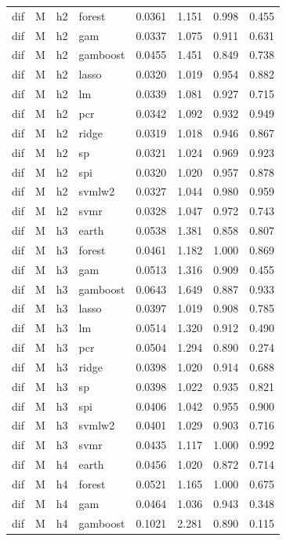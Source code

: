 \begin{ThreePartTable}
\begin{longtable}[t]{llclcccc}
dif & M & h2 & forest & 0.0361 & 1.151 & 0.998 & 0.455\\
dif & M & h2 & gam & 0.0337 & 1.075 & 0.911 & 0.631\\
dif & M & h2 & gamboost & 0.0455 & 1.451 & 0.849 & 0.738\\
dif & M & h2 & lasso & 0.0320 & 1.019 & 0.954 & 0.882\\
dif & M & h2 & lm & 0.0339 & 1.081 & 0.927 & 0.715\\
dif & M & h2 & pcr & 0.0342 & 1.092 & 0.932 & 0.949\\
dif & M & h2 & ridge & 0.0319 & 1.018 & 0.946 & 0.867\\
dif & M & h2 & sp & 0.0321 & 1.024 & 0.969 & 0.923\\
dif & M & h2 & spi & 0.0320 & 1.020 & 0.957 & 0.878\\
dif & M & h2 & svmlw2 & 0.0327 & 1.044 & 0.980 & 0.959\\
dif & M & h2 & svmr & 0.0328 & 1.047 & 0.972 & 0.743\\
\addlinespace
dif & M & h3 & earth & 0.0538 & 1.381 & 0.858 & 0.807\\
dif & M & h3 & forest & 0.0461 & 1.182 & 1.000 & 0.869\\
dif & M & h3 & gam & 0.0513 & 1.316 & 0.909 & 0.455\\
dif & M & h3 & gamboost & 0.0643 & 1.649 & 0.887 & 0.933\\
dif & M & h3 & lasso & 0.0397 & 1.019 & 0.908 & 0.785\\
dif & M & h3 & lm & 0.0514 & 1.320 & 0.912 & 0.490\\
dif & M & h3 & pcr & 0.0504 & 1.294 & 0.890 & 0.274\\
dif & M & h3 & ridge & 0.0398 & 1.020 & 0.914 & 0.688\\
dif & M & h3 & sp & 0.0398 & 1.022 & 0.935 & 0.821\\
dif & M & h3 & spi & 0.0406 & 1.042 & 0.955 & 0.900\\
dif & M & h3 & svmlw2 & 0.0401 & 1.029 & 0.903 & 0.716\\
dif & M & h3 & svmr & 0.0435 & 1.117 & 1.000 & 0.992\\
\addlinespace
dif & M & h4 & earth & 0.0456 & 1.020 & 0.872 & 0.714\\
dif & M & h4 & forest & 0.0521 & 1.165 & 1.000 & 0.675\\
dif & M & h4 & gam & 0.0464 & 1.036 & 0.943 & 0.348\\
dif & M & h4 & gamboost & 0.1021 & 2.281 & 0.890 & 0.115\\

\end{longtable}
\end{ThreePartTable}
